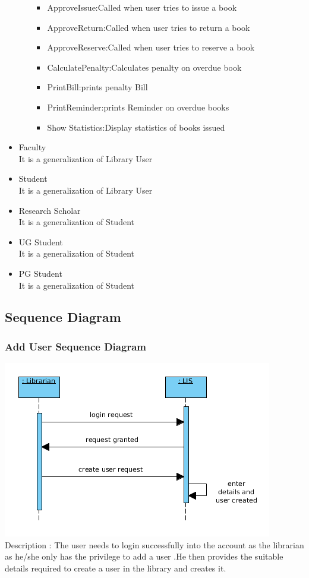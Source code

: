 \documentclass[a4paper]{article}
\begin{document}
\begin{itemize}
\begin{itemize}
\begin{itemize}
\item ApproveIssue:Called when user tries to issue a book
\item ApproveReturn:Called when user tries to return a book

\item ApproveReserve:Called when user tries to reserve a book
\item CalculatePenalty:Calculates penalty on overdue book
\item PrintBill:prints penalty Bill
\item PrintReminder:prints Reminder on overdue books
\item Show Statistics:Display statistics of books issued

\end{itemize}
\end{itemize}

\item Faculty\\
It is a generalization of Library User
\item Student\\
It is a generalization of Library User
\item Research Scholar\\
It is a generalization of Student
\item UG Student\\
It is a generalization of Student
\item PG Student\\
It is a generalization of Student

\end{itemize}
\subsection{Sequence Diagram}
\subsubsection*{Add User Sequence Diagram}
\includegraphics[scale=0.50]{images/seqDiagAddUser.png}
\\
Description : The user needs to login successfully into the account as the librarian as he/she only has the privilege to add a user .He then provides the suitable details required to create a user in the library and creates it.
\\
\end{document}
